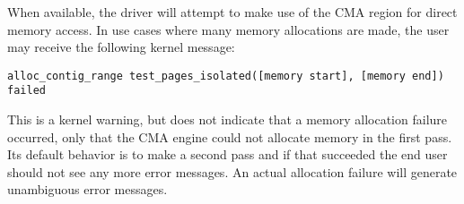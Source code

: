\iffalse
This file is protected by Copyright. Please refer to the COPYRIGHT file
distributed with this source distribution.

This file is part of OpenCPI <http://www.opencpi.org>

OpenCPI is free software: you can redistribute it and/or modify it under the
terms of the GNU Lesser General Public License as published by the Free Software
Foundation, either version 3 of the License, or (at your option) any later
version.

OpenCPI is distributed in the hope that it will be useful, but WITHOUT ANY
WARRANTY; without even the implied warranty of MERCHANTABILITY or FITNESS FOR A
PARTICULAR PURPOSE. See the GNU Lesser General Public License for more details.

You should have received a copy of the GNU Lesser General Public License along
with this program. If not, see <http://www.gnu.org/licenses/>.
\fi

\newlength{\savedparindentdrvr}%
\setlength{\savedparindentdrvr}{\parindent}%
\setlength{\parindent}{0pt} %
\providecommand{\forceindent}{\leavevmode{\parindent=1em\indent}}%

When available, the driver will attempt to make use of the CMA region for direct memory access. In use cases where many memory allocations are made, the user may receive the following kernel message:

\begin{lstlisting}
alloc_contig_range test_pages_isolated([memory start], [memory end]) failed
\end{lstlisting}

This is a kernel warning, but does not indicate that a memory allocation failure occurred, only that the CMA engine could not allocate memory in the first pass. Its default behavior is to make a second pass and if that succeeded the end user should not see any more error messages. An actual allocation failure will generate unambiguous error messages.

\setlength{\parindent}{\savedparindentdrvr}%
